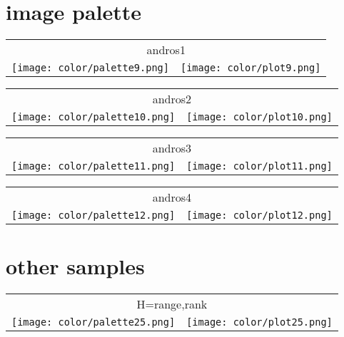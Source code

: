 \documentclass{article}
\begin{document}
\newpage
\section{image palette}

\begin{center}
\begin{tabular}{m{8cm}m{8cm}}
\multicolumn{2}{c}{andros1} \\
\texttt{[image: color/palette9.png]} &
\texttt{[image: color/plot9.png]}
\end{tabular}
\end{center}

\begin{center}
\begin{tabular}{m{8cm}m{8cm}}
\multicolumn{2}{c}{andros2} \\
\texttt{[image: color/palette10.png]} &
\texttt{[image: color/plot10.png]}
\end{tabular}
\end{center}

\begin{center}
\begin{tabular}{m{8cm}m{8cm}}
\multicolumn{2}{c}{andros3} \\
\texttt{[image: color/palette11.png]} &
\texttt{[image: color/plot11.png]}
\end{tabular}
\end{center}

\begin{center}
\begin{tabular}{m{8cm}m{8cm}}
\multicolumn{2}{c}{andros4} \\
\texttt{[image: color/palette12.png]} &
\texttt{[image: color/plot12.png]}
\end{tabular}
\end{center}

\newpage
\section{other samples}

\begin{center}
\begin{tabular}{m{8cm}m{8cm}}
\multicolumn{2}{c}{H=range,rank} \\
\texttt{[image: color/palette25.png]} &
\texttt{[image: color/plot25.png]}
\end{tabular}
\end{center}
\end{document}
